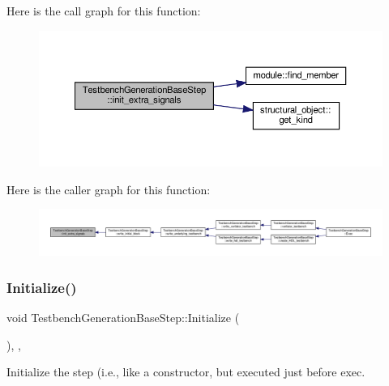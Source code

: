 Here is the call graph for this function\+:
\nopagebreak
\begin{figure}[H]
\begin{center}
\leavevmode
\includegraphics[width=350pt]{dc/d02/classTestbenchGenerationBaseStep_a8f0da7801c3e9c8050240d9567d70bc9_cgraph}
\end{center}
\end{figure}
Here is the caller graph for this function\+:
\nopagebreak
\begin{figure}[H]
\begin{center}
\leavevmode
\includegraphics[width=350pt]{dc/d02/classTestbenchGenerationBaseStep_a8f0da7801c3e9c8050240d9567d70bc9_icgraph}
\end{center}
\end{figure}
\mbox{\label{classTestbenchGenerationBaseStep_a3c3722de551d16d1d2b9c0fa22e73bcb}} 
\subsubsection{\texorpdfstring{Initialize()}{Initialize()}}
{\footnotesize\ttfamily void Testbench\+Generation\+Base\+Step\+::\+Initialize (\begin{DoxyParamCaption}{ }\end{DoxyParamCaption})\hspace{0.3cm}{\ttfamily [override]}, {\ttfamily [protected]}, {\ttfamily [virtual]}}



Initialize the step (i.\+e., like a constructor, but executed just before exec. 




